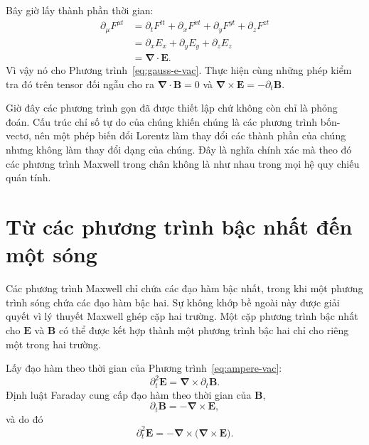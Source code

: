Bây giờ lấy thành phần thời gian:
\begin{align}
\partial_\mu F^{\mu t}
&=\partial_tF^{tt}
  +\partial_xF^{xt}
  +\partial_yF^{yt}
  +\partial_zF^{zt}\\
&=\partial_xE_x+\partial_yE_y+\partial_zE_z\\
&=\boldsymbol\nabla\cdot\mathbf E.
\end{align}
Vì vậy nó cho Phương trình~\eqref{eq:gauss-e-vac}. Thực hiện cùng những phép kiểm tra đó trên tensor đối ngẫu cho ra
\(\boldsymbol\nabla\cdot\mathbf B=0\) và
\(\boldsymbol\nabla\times\mathbf E=-\partial_t\mathbf B\).

Giờ đây các phương trình gọn đã được thiết lập chứ không còn chỉ là phỏng đoán. Cấu trúc chỉ số tự do của chúng khiến chúng là các phương trình bốn-vectơ, nên một phép biến đổi Lorentz làm thay đổi các thành phần của chúng nhưng không làm thay đổi dạng của chúng. Đây là nghĩa chính xác mà theo đó các phương trình Maxwell trong chân không là như nhau trong mọi hệ quy chiếu quán tính.

\section{Từ các phương trình bậc nhất đến một sóng}

Các phương trình Maxwell chỉ chứa các đạo hàm bậc nhất, trong khi một phương trình sóng chứa các đạo hàm bậc hai. Sự không khớp bề ngoài này được giải quyết vì lý thuyết Maxwell ghép cặp hai trường. Một cặp phương trình bậc nhất cho \(\mathbf E\) và \(\mathbf B\) có thể được kết hợp thành một phương trình bậc hai chỉ cho riêng một trong hai trường.

Lấy đạo hàm theo thời gian của Phương trình~\eqref{eq:ampere-vac}:
\begin{equation}
\partial_t^2\mathbf E
=\boldsymbol\nabla\times\partial_t\mathbf B.
\end{equation}
Định luật Faraday cung cấp đạo hàm theo thời gian của \(\mathbf B\),
\begin{equation}
\partial_t\mathbf B=-\boldsymbol\nabla\times\mathbf E,
\end{equation}
và do đó
\begin{equation}
\partial_t^2\mathbf E
=-\boldsymbol\nabla\times
  \bigl(\boldsymbol\nabla\times\mathbf E\bigr).
\label{eq:double-curl}
\end{equation}

